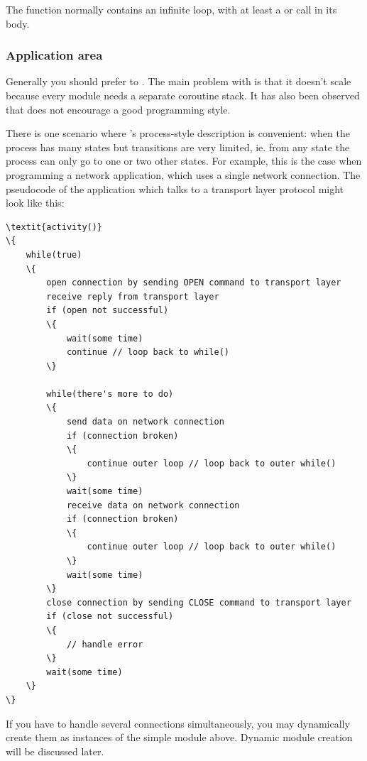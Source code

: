 The  function normally contains an infinite loop,
with at least a  or  call in its body.



\subsubsection{Application area}

Generally you should prefer  to .
The main problem with  is that it doesn't scale because
every module needs a separate coroutine stack. It has also been observed
that  does not encourage a good programming style.

There is one scenario where 's process-style
description is convenient: when the process has many
states but transitions are very limited, ie. from any state the
process can only go to one or two other states.  For example, this is
the case when programming a network application, which uses a single
network connection.  The pseudocode of the application which talks to
a transport layer protocol might look like this:

\begin{Verbatim}[commandchars=\\\{\}]
\textit{activity()}
\{
    while(true)
    \{
        open connection by sending OPEN command to transport layer
        receive reply from transport layer
        if (open not successful)
        \{
            wait(some time)
            continue // loop back to while()
        \}

        while(there's more to do)
        \{
            send data on network connection
            if (connection broken)
            \{
                continue outer loop // loop back to outer while()
            \}
            wait(some time)
            receive data on network connection
            if (connection broken)
            \{
                continue outer loop // loop back to outer while()
            \}
            wait(some time)
        \}
        close connection by sending CLOSE command to transport layer
        if (close not successful)
        \{
            // handle error
        \}
        wait(some time)
    \}
\}
\end{Verbatim}

If you have to handle several connections simultaneously, you may
dynamically create them as instances of the simple module above.
Dynamic module creation will be discussed later.

